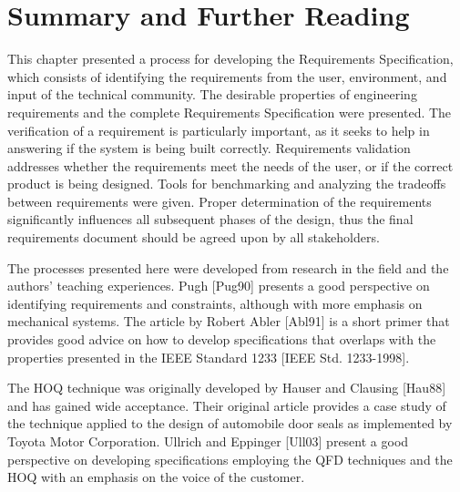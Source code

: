 \section{Summary and Further Reading }
\label{section:reqSpecSummary-and-further-reading}

This chapter presented a process for developing the Requirements
Specification, which consists of identifying the requirements from the
user, environment, and input of the technical community. The desirable
properties of engineering requirements and the complete Requirements
Specification were presented. The verification of a requirement is
particularly important, as it seeks to help in answering if the system
is being built correctly. Requirements validation addresses whether the
requirements meet the needs of the user, or if the correct product is
being designed. Tools for benchmarking and analyzing the tradeoffs
between requirements were given. Proper determination of the
requirements significantly influences all subsequent phases of the
design, thus the final requirements document should be agreed upon by
all stakeholders.

The processes presented here were developed from research in the field
and the authors' teaching experiences. Pugh {[}Pug90{]} presents a good
perspective on identifying requirements and constraints, although with
more emphasis on mechanical systems. The article by Robert Abler
{[}Abl91{]} is a short primer that provides good advice on how to
develop specifications that overlaps with the properties presented in
the IEEE Standard 1233 {[}IEEE Std. 1233-1998{]}.

The HOQ technique was originally developed by Hauser and Clausing
{[}Hau88{]} and has gained wide acceptance. Their original article
provides a case study of the technique applied to the design of
automobile door seals as implemented by Toyota Motor Corporation.
Ullrich and Eppinger {[}Ull03{]} present a good perspective on
developing specifications employing the QFD techniques and the HOQ with
an emphasis on the voice of the customer.
